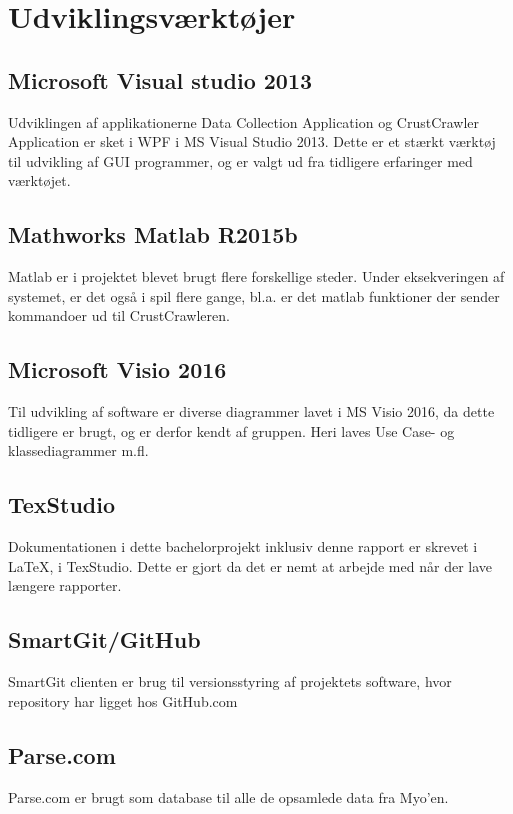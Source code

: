 \section{Udviklingsværktøjer}
\label{sec:Udviklingsvaerktojer}

\subsection*{Microsoft Visual studio 2013}
Udviklingen af applikationerne Data Collection Application og CrustCrawler Application er sket i WPF i MS Visual Studio 2013. Dette er et stærkt værktøj til udvikling af GUI programmer, og er valgt ud fra tidligere erfaringer med værktøjet.

\subsection*{Mathworks Matlab R2015b}
Matlab er i projektet blevet brugt flere forskellige steder. Under eksekveringen af systemet, er det også i spil flere gange, bl.a. er det matlab funktioner der sender kommandoer ud til CrustCrawleren.

\subsection*{Microsoft Visio 2016}

Til udvikling af software er diverse diagrammer lavet i MS Visio 2016, da dette tidligere er brugt, og er derfor kendt af gruppen. Heri laves Use Case- og klassediagrammer m.fl.

\subsection*{TexStudio}
Dokumentationen i dette bachelorprojekt inklusiv denne rapport er skrevet i \LaTeX, i TexStudio. Dette er gjort da det er nemt at arbejde med når der lave længere rapporter.

\subsection*{SmartGit/GitHub}
SmartGit clienten er brug til versionsstyring af projektets software, hvor repository har ligget hos GitHub.com

\subsection*{Parse.com}
Parse.com \citep{RefWorks:11} er brugt som database til alle de opsamlede data fra Myo'en.

